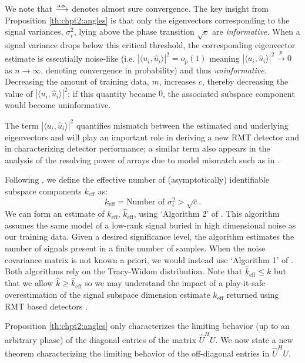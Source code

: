 We note that $\overset{\textrm{a.s.}}{\longrightarrow}$ denotes almost sure convergence. The key insight from Proposition \ref{th:chpt2:angles} is that only the eigenvectors corresponding to the signal variances, $\sigma_i^2$, lying above the phase transition $\sqrt{c}$ are \textit{informative}. When a signal variance drops below this critical threshold, the corresponding eigenvector estimate is essentially noise-like  (i.e. $|\langle u_i,\widehat{u}_i\rangle|^2=o_{p}(1)$ meaning $|\langle u_i,\widehat{u}_i\rangle|^2\overset{p}{\to}0$ as $n\to\infty$, denoting convergence in probability) and thus \textit{uninformative}. Decreasing the amount of training data, $m$, increases $c$, thereby decreasing the value of $|\langle u_i,\widehat{u}_i\rangle|^2$; if this quantity became $0$, the associated subspace component would become uninformative.

The term $|\langle u_i,\widehat{u}_i\rangle|^2$ quantifies mismatch between the estimated and underlying eigenvectors and will play an important role in deriving a new RMT detector and in characterizing detector performance; a similar term also appears in the analysis of the resolving power of arrays due to model mismatch such as in \cite{cox1973resolving}.


Following \cite{nadakuditi2008sample}, we define the effective number of (asymptotically) identifiable subspace components $k_\text{eff}$ as:
\begin{equation}\label{eq:chpt2:keff}
\boxed{k_\text{eff} = \text{Number of } \sigma_i^2 > \sqrt{c}}.
\end{equation}
We can form an estimate of $k_\text{eff}$, $\widehat{k}_{\text{eff}}$, using  `Algorithm 2' of  \cite{nadakuditi2010fundamental}. This algorithm assumes the same model of a low-rank signal buried in high dimensional noise as our training data. Given a desired significance level, the algorithm estimates the number of signals present in a finite number of samples. When the noise covariance matrix is not known a priori, we would instead use `Algorithm 1' of \cite{nadakuditi2010fundamental}. Both algorithms rely on the Tracy-Widom distribution. Note that $\widehat{k}_{\text{eff}} \leq k$ but that we allow $\widehat{k} \geq \widehat{k}_{\text{eff}}$ so we may understand the impact of a play-it-safe overestimation of the signal subspace dimension estimate $\widehat{k}_{\text{eff}}$  returned using RMT based detectors \cite{nadakuditi2010fundamental,johnstone2001distribution,el2007tracy}.

Proposition \ref{th:chpt2:angles} only characterizes the limiting behavior (up to an arbitrary phase) of  the diagonal entries of the matrix $\widehat{U}^HU$. We now state a new theorem characterizing the limiting behavior of the off-diagonal entries in $\widehat{U}^HU$.

